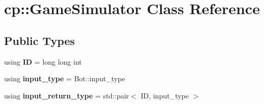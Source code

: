 \hypertarget{classcp_1_1_game_simulator}{}\section{cp\+:\+:Game\+Simulator Class Reference}
\label{classcp_1_1_game_simulator}
\subsection*{Public Types}
\begin{DoxyCompactItemize}
\item 
\mbox{\label{classcp_1_1_game_simulator_ab5c123bfd5895d6a98fa97e1ecf496f3}} 
using {\bfseries ID} = long long int
\item 
\mbox{\label{classcp_1_1_game_simulator_a293ce7623321b8622c6ad31a26c3a5ef}} 
using {\bfseries input\+\_\+type} = Bot\+::input\+\_\+type
\item 
\mbox{\label{classcp_1_1_game_simulator_ac69abb25c0cc70fe1ae3c0b4454e382a}} 
using {\bfseries input\+\_\+return\+\_\+type} = std\+::pair$<$ ID, input\+\_\+type $>$
\end{DoxyCompactItemize}
